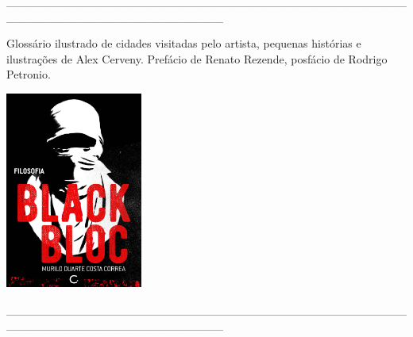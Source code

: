 \hspace*{-2cm}\_\_\_\_\_\_\_\_\_\_\_\_\_\_\_\_\_\_\_\_\_\_\_\_\_\_\_\_\_\_\_\_\_\_\_\_\_\_\_\_\_\_\_\_\_\_\_\_\_\_\_\_\_\_\_\_\_\_\_\_\_\_\_\_\_\_\_\_\_\_\_\_\_\_

\medskip

\noindent{}Glossário ilustrado de cidades visitadas pelo artista, pequenas histórias e ilustrações de Alex Cerveny. Prefácio de Renato Rezende, posfácio de Rodrigo Petronio.

\hspace{.5cm}

\hspace*{-.4cm}\begin{minipage}[c]{0.90\linewidth}
\small{
{}}
\end{minipage}

\pagebreak

\hspace{.5cm}

\begin{center}
\hspace*{-2.5cm}
\hspace{2cm}\includegraphics[width=45mm]{./imgs/blackbloc.jpg}
\end{center}

\hspace*{-2cm}\_\_\_\_\_\_\_\_\_\_\_\_\_\_\_\_\_\_\_\_\_\_\_\_\_\_\_\_\_\_\_\_\_\_\_\_\_\_\_\_\_\_\_\_\_\_\_\_\_\_\_\_\_\_\_\_\_\_\_\_\_\_\_\_\_\_\_\_\_\_\_\_\_\_

